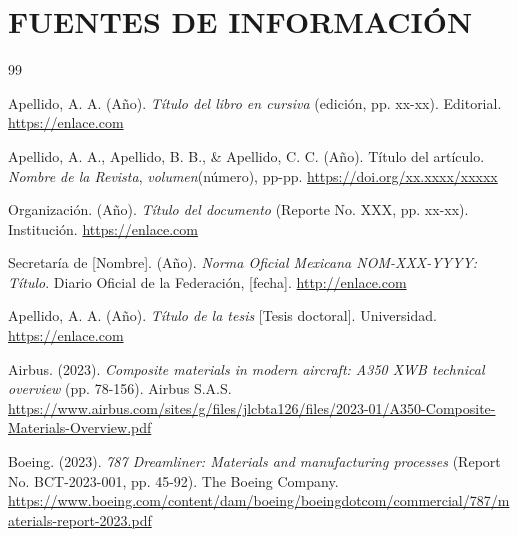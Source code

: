 \documentclass[12pt, a4paper]{article}
\begin{document}
\newpage

\section*{FUENTES DE INFORMACIÓN}



\begin{thebibliography}{99}
\setlength{\itemsep}{0.5em}

Apellido, A. A. (Año). \textit{Título del libro en cursiva} (edición, pp. xx-xx). Editorial. \url{https://enlace.com}

Apellido, A. A., Apellido, B. B., \& Apellido, C. C. (Año). Título del artículo. \textit{Nombre de la Revista}, \textit{volumen}(número), pp-pp. \url{https://doi.org/xx.xxxx/xxxxx}

Organización. (Año). \textit{Título del documento} (Reporte No. XXX, pp. xx-xx). Institución. \url{https://enlace.com}

Secretaría de [Nombre]. (Año). \textit{Norma Oficial Mexicana NOM-XXX-YYYY: Título}. Diario Oficial de la Federación, [fecha]. \url{http://enlace.com}

Apellido, A. A. (Año). \textit{Título de la tesis} [Tesis doctoral]. Universidad. \url{https://enlace.com}


Airbus. (2023). \textit{Composite materials in modern aircraft: A350 XWB technical overview} (pp. 78-156). Airbus S.A.S. \url{https://www.airbus.com/sites/g/files/jlcbta126/files/2023-01/A350-Composite-Materials-Overview.pdf}

Boeing. (2023). \textit{787 Dreamliner: Materials and manufacturing processes} (Report No. BCT-2023-001, pp. 45-92). The Boeing Company. \url{https://www.boeing.com/content/dam/boeing/boeingdotcom/commercial/787/materials-report-2023.pdf}


\end{thebibliography}
\end{document}
